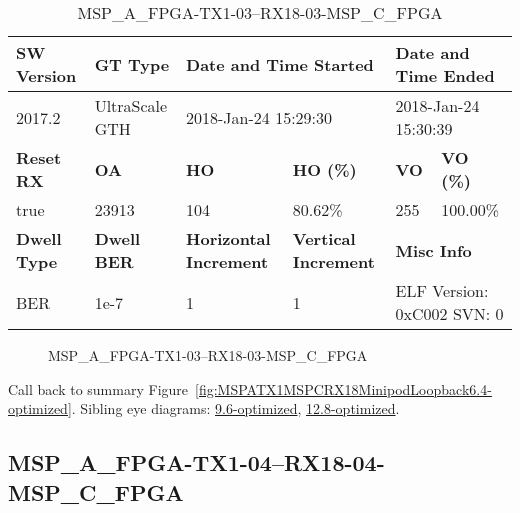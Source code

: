 \begin{table}[h]
\centering
\caption{MSP\_A\_FPGA-TX1-03--RX18-03-MSP\_C\_FPGA}
\label{tab:MSPAFPGATX103RX1803MSPCFPGA6.4-optimized}
\begin{tabular}{@{}|l|l|l|l|l|l|@{}}
\toprule
\textbf{SW Version}                & \textbf{GT Type}   & \multicolumn{2}{l|}{\textbf{Date and Time Started}}            & \multicolumn{2}{l|}{\textbf{Date and Time Ended}}        \\ \midrule
2017.2                       & UltraScale GTH          & \multicolumn{2}{l|}{2018-Jan-24 15:29:30}                   & \multicolumn{2}{l|}{2018-Jan-24 15:30:39}               \\ \midrule
\textbf{Reset RX}                  & \textbf{OA} & \textbf{HO}   & \textbf{HO (\%)} & \textbf{VO} & \textbf{VO (\%)} \\ \midrule
true & 23913        & 104          & 80.62\%        & 255        & 100.00\%       \\ \midrule
\textbf{Dwell Type}                & \textbf{Dwell BER} & \textbf{Horizontal Increment} & \textbf{Vertical Increment}    & \multicolumn{2}{l|}{\textbf{Misc Info}}                  \\ \midrule
BER                            & 1e-7        & 1        & 1           & \multicolumn{2}{l|}{ELF Version: 0xC002 SVN: 0}                         \\ \bottomrule
\end{tabular}
\end{table}

\begin{figure}[h]
\caption{MSP\_A\_FPGA-TX1-03--RX18-03-MSP\_C\_FPGA} \label{fig:MSPAFPGATX103RX1803MSPCFPGA6.4-optimized}
\end{figure}

Call back to summary Figure~\ref{fig:MSPATX1MSPCRX18MinipodLoopback6.4-optimized}.
Sibling eye diagrams: \hyperref[sec:MSPAFPGATX103RX1803MSPCFPGA9.6-optimized]{9.6-optimized}, \hyperref[sec:MSPAFPGATX103RX1803MSPCFPGA12.8-optimized]{12.8-optimized}.

\clearpage
\newpage


\subsection{MSP\_A\_FPGA-TX1-04--RX18-04-MSP\_C\_FPGA}\label{sec:MSPAFPGATX104RX1804MSPCFPGA6.4-optimized}

